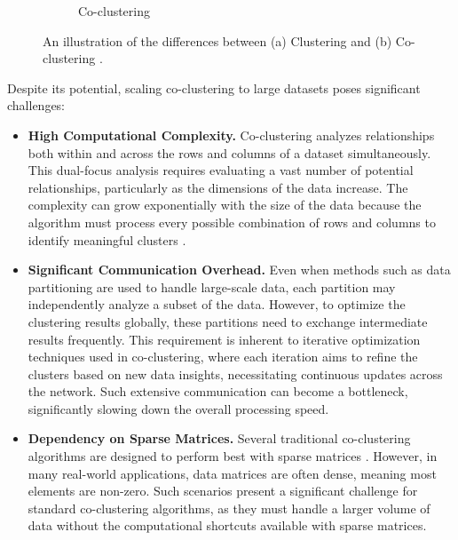 \documentclass[letterpaper, 10 pt, conference]{ieeeconf}  %
\begin{document}
\begin{figure}[htbp]
\begin{subfigure}[b]{0.22\textwidth}
        \caption{Co-clustering}
        \label{fig:cocluster}
    \end{subfigure}
    \caption{An illustration of the differences between (a) Clustering and (b) Co-clustering \cite{yan2017CoclusteringMultidimensionalBig}.}
    \label{fig:cocomparison}
\end{figure}

Despite its potential, scaling co-clustering to large datasets poses significant challenges:

\begin{itemize}
    \item{\textbf{High Computational Complexity.}} Co-clustering analyzes relationships both within and across the rows and columns of a dataset simultaneously. This dual-focus analysis requires evaluating a vast number of potential relationships, particularly as the dimensions of the data increase. The complexity can grow exponentially with the size of the data because the algorithm must process every possible combination of rows and columns to identify meaningful clusters \cite{hansen2011NonparametricCoclusteringLarge}.
    \item{\textbf{Significant Communication Overhead.}} Even when methods such as data partitioning are used to handle large-scale data, each partition may independently analyze a subset of the data. However, to optimize the clustering results globally, these partitions need to exchange intermediate results frequently. This requirement is inherent to iterative optimization techniques used in co-clustering, where each iteration aims to refine the clusters based on new data insights, necessitating continuous updates across the network. Such extensive communication can become a bottleneck, significantly slowing down the overall processing speed.
    \item{\textbf{Dependency on Sparse Matrices.}} Several traditional co-clustering algorithms are designed to perform best with sparse matrices \cite{pan2008CRDFastCoclustering}. However, in many real-world applications, data matrices are often dense, meaning most elements are non-zero. Such scenarios present a significant challenge for standard co-clustering algorithms, as they must handle a larger volume of data without the computational shortcuts available with sparse matrices.
\end{itemize}
\end{document}
